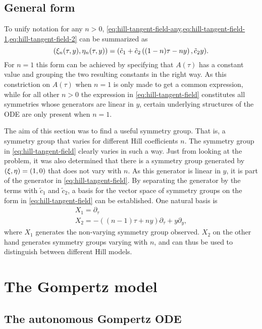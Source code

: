 \subsection{General form}

To unify notation for any \(n>0\), \cref{eq:hill-tangent-field-any,eq:hill-tangent-field-1,eq:hill-tangent-field-2} can be summarized as
\begin{equation} \label{eq:hill-tangent-field}
  \pqty{\xi_n(\tau,y),\eta_n(\tau,y)} = 
  \pqty{\tilde{c}_1 + \tilde{c}_2 \left( (1-n) \tau - n y \right), \tilde{c}_2 y}.
\end{equation}
For \(n=1\) this form can be achieved by specifying that \(A(\tau)\) has a constant value and grouping the two resulting constants in the right way.
As this constriction on \(A(\tau)\) when \(n=1\) is only made to get a common expression, while for all other \(n>0\) the expression in \cref{eq:hill-tangent-field} constitutes all symmetries whose generators are linear in \(y\), certain underlying structures of the ODE are only present when \(n=1\). %

The aim of this section was to find a useful symmetry group.
That is, a symmetry group that varies for different Hill coefficients \(n\).
The symmetry group in \cref{eq:hill-tangent-field} clearly varies in such a way.
Just from looking at the problem, it was also determined that there is a symmetry group generated by \(\pqty{\xi,\eta} = \pqty{1,0}\) that does not vary with \(n\).
As this generator is linear in \(y\), it is part of the generator in \cref{eq:hill-tangent-field}.
By separating the generator by the terms with \(\tilde{c}_1\) and \(\tilde{c}_2\), a basis for the vector space of symmetry groups on the form in \cref{eq:hill-tangent-field} can be established.
One natural basis is
\begin{gather}
  X_1 = \partial_\tau \\
  X_2 = - \left( (n-1) \tau + n y \right) \partial_\tau + y \partial_y,
\end{gather}
where \(X_1\) generates the non-varying symmetry group observed.
\(X_2\) on the other hand generates symmetry groups varying with \(n\), and can thus be used to distinguish between different Hill models.

\section{The Gompertz model}

\subsection{The autonomous Gompertz ODE}

